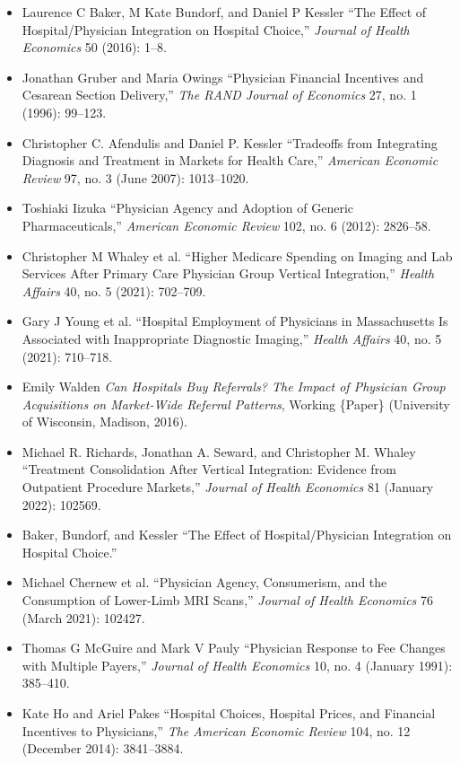 \documentclass[11pt,]{article}
\providecommand{\tightlist}{%
  \setlength{\itemsep}{0pt}\setlength{\parskip}{0pt}}
\begin{document}
\begin{itemize}
\tightlist
\item
  Laurence C Baker, M Kate Bundorf, and Daniel P Kessler {``The {Effect}
  of {Hospital}/{Physician} {Integration} on {Hospital} {Choice},''}
  \emph{Journal of Health Economics} 50 (2016): 1--8.
\item
  Jonathan Gruber and Maria Owings {``Physician Financial Incentives and
  Cesarean Section Delivery,''} \emph{The RAND Journal of Economics} 27,
  no. 1 (1996): 99--123.
\item
  Christopher C. Afendulis and Daniel P. Kessler {``Tradeoffs from
  {Integrating} {Diagnosis} and {Treatment} in {Markets} for {Health}
  {Care},''} \emph{American Economic Review} 97, no. 3 (June 2007):
  1013--1020.
\item
  Toshiaki Iizuka {``Physician Agency and Adoption of Generic
  Pharmaceuticals,''} \emph{American Economic Review} 102, no. 6 (2012):
  2826--58.
\item
  Christopher M Whaley et al. {``Higher {Medicare} {Spending} on
  {Imaging} and {Lab} {Services} After {Primary} {Care} {Physician}
  {Group} {Vertical} {Integration},''} \emph{Health Affairs} 40, no. 5
  (2021): 702--709.
\item
  Gary J Young et al. {``Hospital {Employment} of {Physicians} in
  {Massachusetts} {Is} {Associated} with {Inappropriate} {Diagnostic}
  {Imaging},''} \emph{Health Affairs} 40, no. 5 (2021): 710--718.
\item
  Emily Walden \emph{Can {Hospitals} {Buy} {Referrals}? {The} {Impact}
  of {Physician} {Group} {Acquisitions} on {Market}-{Wide} {Referral}
  {Patterns}}, Working \{Paper\} (University of Wisconsin, Madison,
  2016).
\item
  Michael R. Richards, Jonathan A. Seward, and Christopher M. Whaley
  {``Treatment Consolidation After Vertical Integration: {Evidence} from
  Outpatient Procedure Markets,''} \emph{Journal of Health Economics} 81
  (January 2022): 102569.
\item
  Baker, Bundorf, and Kessler {``The {Effect} of {Hospital}/{Physician}
  {Integration} on {Hospital} {Choice}.''}
\item
  Michael Chernew et al. {``Physician Agency, Consumerism, and the
  Consumption of Lower-Limb {MRI} Scans,''} \emph{Journal of Health
  Economics} 76 (March 2021): 102427.
\item
  Thomas G McGuire and Mark V Pauly {``Physician Response to Fee Changes
  with Multiple Payers,''} \emph{Journal of Health Economics} 10, no. 4
  (January 1991): 385--410.
\item
  Kate Ho and Ariel Pakes {``Hospital {Choices}, {Hospital} {Prices},
  and {Financial} {Incentives} to {Physicians},''} \emph{The American
  Economic Review} 104, no. 12 (December 2014): 3841--3884.
\end{itemize}
\end{document}

